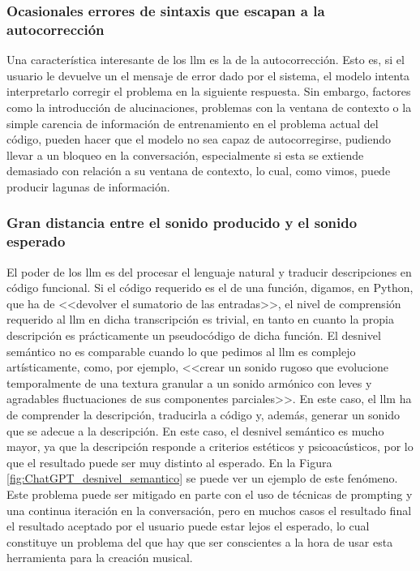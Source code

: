 \subsubsection{Ocasionales errores de sintaxis que escapan a la autocorrección}
Una característica interesante de los \gls{llm} es la de la autocorrección. Esto es, si el usuario le devuelve un el mensaje de error dado por el sistema, el modelo intenta interpretarlo corregir el problema en la siguiente respuesta. Sin embargo, factores como la introducción de alucinaciones, problemas con la ventana de contexto o la simple carencia de información de entrenamiento en el problema actual del código, pueden hacer que el modelo no sea capaz de autocorregirse, pudiendo llevar a un bloqueo en la conversación, especialmente si esta se extiende demasiado con relación a su ventana de contexto, lo cual, como vimos, puede producir lagunas de información.


\subsubsection{Gran distancia entre el sonido producido y el sonido esperado}
El poder de los \gls{llm} es del procesar el lenguaje natural y traducir descripciones en código funcional. Si el código requerido es el de una función, digamos, en {Python}, que ha de <<devolver el sumatorio de las entradas>>, el nivel de comprensión requerido al \gls{llm} en dicha transcripción es trivial, en tanto en cuanto la propia descripción es prácticamente un pseudocódigo de dicha función. El desnivel semántico no es comparable cuando lo que pedimos al \gls{llm} es complejo artísticamente, como, por ejemplo, <<crear un sonido rugoso que evolucione temporalmente de una textura granular a un sonido armónico con leves y agradables fluctuaciones de sus componentes parciales>>. En este caso, el \gls{llm} ha de comprender la descripción, traducirla a código y, además, generar un sonido que se adecue a la descripción.  En este caso, el desnivel semántico es mucho mayor, ya que la descripción responde a criterios estéticos y psicoacústicos, por lo que el resultado puede ser muy distinto al esperado. En la Figura \ref{fig:ChatGPT_desnivel_semantico} se puede ver un ejemplo de este fenómeno. Este problema puede ser mitigado en parte con el uso de técnicas de prompting y una continua iteración en la conversación, pero en muchos casos el resultado final el resultado aceptado por el usuario puede estar lejos el esperado, lo cual constituye un problema del que hay que ser conscientes a la hora de usar esta herramienta para la creación musical.

